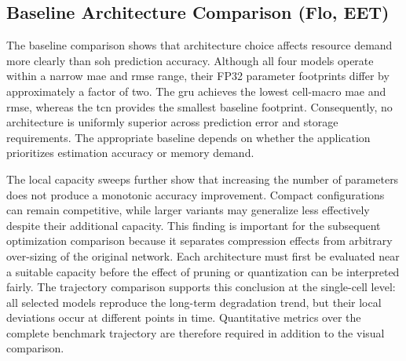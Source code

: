 \documentclass[final,3p,times]{elsarticle}
\begin{document}
\subsection{Baseline Architecture Comparison (Flo, EET)}
The baseline comparison shows that architecture choice affects resource demand more clearly than \ac{soh} prediction accuracy. Although all four models operate within a narrow \ac{mae} and \ac{rmse} range, their FP32 parameter footprints differ by approximately a factor of two. The \ac{gru} achieves the lowest cell-macro \ac{mae} and \ac{rmse}, whereas the \ac{tcn} provides the smallest baseline footprint. Consequently, no architecture is uniformly superior across prediction error and storage requirements. The appropriate baseline depends on whether the application prioritizes estimation accuracy or memory demand.

The local capacity sweeps further show that increasing the number of parameters does not produce a monotonic accuracy improvement. Compact configurations can remain competitive, while larger variants may generalize less effectively despite their additional capacity. This finding is important for the subsequent optimization comparison because it separates compression effects from arbitrary over-sizing of the original network. Each architecture must first be evaluated near a suitable capacity before the effect of pruning or quantization can be interpreted fairly. The trajectory comparison supports this conclusion at the single-cell level: all selected models reproduce the long-term degradation trend, but their local deviations occur at different points in time. Quantitative metrics over the complete benchmark trajectory are therefore required in addition to the visual comparison.

\end{document}
